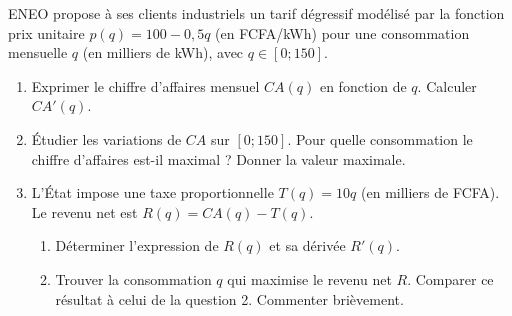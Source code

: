 \documentclass[11pt]{article}
\begin{document}
\begin{exercice}
ENEO propose à ses clients industriels un tarif dégressif modélisé par la fonction prix unitaire $p(q) = 100 - 0,5q$ (en FCFA/kWh) pour une consommation mensuelle $q$ (en milliers de kWh), avec $q \in [0; 150]$.
\begin{enumerate}
    \item Exprimer le chiffre d'affaires mensuel $CA(q)$ en fonction de $q$. Calculer $CA'(q)$.
    \item Étudier les variations de $CA$ sur $[0; 150]$. Pour quelle consommation le chiffre d'affaires est-il maximal ? Donner la valeur maximale.
    \item L'État impose une taxe proportionnelle $T(q) = 10q$ (en milliers de FCFA). Le revenu net est $R(q) = CA(q) - T(q)$.
    \begin{enumerate}
        \item Déterminer l'expression de $R(q)$ et sa dérivée $R'(q)$.
        \item Trouver la consommation $q$ qui maximise le revenu net $R$. Comparer ce résultat à celui de la question 2. Commenter brièvement.
    \end{enumerate}
\end{enumerate}
\end{exercice}
\end{document}
